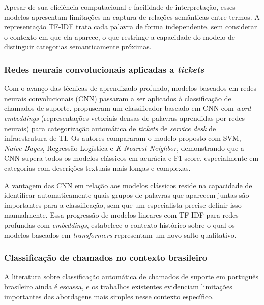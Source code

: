 \documentclass[
    12pt,                %
    openright,           %
    oneside,             %
    a4paper,             %
    english,             %
    brazil               %
]{abntex2}
\begin{document}
Apesar de sua eficiência computacional e facilidade de interpretação, esses modelos apresentam limitações na captura de relações semânticas entre termos. A representação TF-IDF trata cada palavra de forma independente, sem considerar o contexto em que ela aparece, o que restringe a capacidade do modelo de distinguir categorias semanticamente próximas.

\subsubsection{Redes neurais convolucionais aplicadas a \textit{tickets}}
\label{subsubsec:helpdesk_cnn}

Com o avanço das técnicas de aprendizado profundo, modelos baseados em redes neurais convolucionais (CNN) passaram a ser aplicados à classificação de chamados de suporte.  propuseram um classificador baseado em CNN com \textit{word embeddings} (representações vetoriais densas de palavras aprendidas por redes neurais) para categorização automática de \textit{tickets} de \textit{service desk} de infraestrutura de TI. Os autores compararam o modelo proposto com SVM, \textit{Naive Bayes}, Regressão Logística e \textit{K-Nearest Neighbor}, demonstrando que a CNN supera todos os modelos clássicos em acurácia e F1-score, especialmente em categorias com descrições textuais mais longas e complexas.

A vantagem das CNN em relação aos modelos clássicos reside na capacidade de identificar automaticamente quais grupos de palavras que aparecem juntas são importantes para a classificação, sem que um especialista precise definir isso manualmente. Essa progressão de modelos lineares com TF-IDF para redes profundas com \textit{embeddings}, estabelece o contexto histórico sobre o qual os modelos baseados em \textit{transformers} representam um novo salto qualitativo.

\subsubsection{Classificação de chamados no contexto brasileiro}
\label{subsubsec:helpdesk_brasil}

A literatura sobre classificação automática de chamados de suporte em português brasileiro ainda é escassa, e os trabalhos existentes evidenciam limitações importantes das abordagens mais simples nesse contexto específico.
\end{document}
